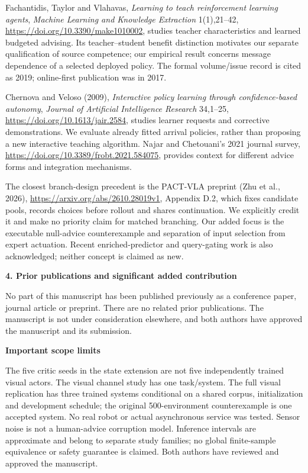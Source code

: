 \documentclass[11pt,a4paper]{article}
\begin{document}
Fachantidis, Taylor and Vlahavas, \emph{Learning to teach reinforcement learning agents}, \emph{Machine Learning and Knowledge Extraction} 1(1),21--42, \url{https://doi.org/10.3390/make1010002}, studies teacher characteristics and learned budgeted advising. Its teacher--student benefit distinction motivates our separate qualification of source competence; our empirical result concerns message dependence of a selected deployed policy. The formal volume/issue record is cited as 2019; online-first publication was in 2017.

Chernova and Veloso (2009), \emph{Interactive policy learning through confidence-based autonomy}, \emph{Journal of Artificial Intelligence Research} 34,1--25, \url{https://doi.org/10.1613/jair.2584}, studies learner requests and corrective demonstrations. We evaluate already fitted arrival policies, rather than proposing a new interactive teaching algorithm. Najar and Chetouani's 2021 journal survey, \url{https://doi.org/10.3389/frobt.2021.584075}, provides context for different advice forms and integration mechanisms.

The closest branch-design precedent is the PACT-VLA preprint (Zhu et al., 2026), \url{https://arxiv.org/abs/2610.28019v1}, Appendix D.2, which fixes candidate pools, records choices before rollout and shares continuation. We explicitly credit it and make no priority claim for matched branching. Our added focus is the executable null-advice counterexample and separation of input selection from expert actuation. Recent enriched-predictor and query-gating work is also acknowledged; neither concept is claimed as new.

\textbf{4. Prior publications and significant added contribution}

No part of this manuscript has been published previously as a conference paper, journal article or preprint. There are no related prior publications. The manuscript is not under consideration elsewhere, and both authors have approved the manuscript and its submission.

\textbf{Important scope limits}

The five critic seeds in the state extension are not five independently trained visual actors. The visual channel study has one task/system. The full visual replication has three trained systems conditional on a shared corpus, initialization and development schedule; the original 500-environment counterexample is one accepted system. No real robot or actual asynchronous service was tested. Sensor noise is not a human-advice corruption model. Inference intervals are approximate and belong to separate study families; no global finite-sample equivalence or safety guarantee is claimed. Both authors have reviewed and approved the manuscript.
\end{document}

